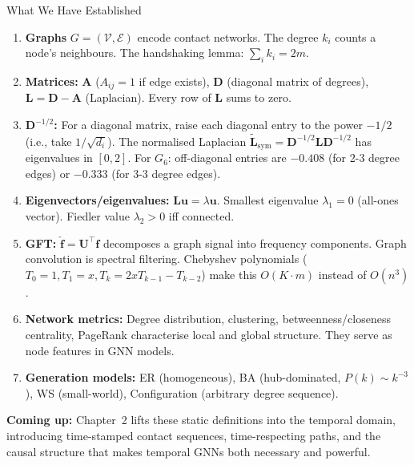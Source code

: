 \begin{conceptbox}{What We Have Established}
\begin{enumerate}[noitemsep]
    \item \textbf{Graphs} $G = (\mathcal{V}, \mathcal{E})$ encode contact networks. The degree $k_i$ counts a node's neighbours. The handshaking lemma: $\sum_i k_i = 2m$.
    \item \textbf{Matrices:} $\mathbf{A}$ ($A_{ij}=1$ if edge exists), $\mathbf{D}$ (diagonal matrix of degrees), $\mathbf{L} = \mathbf{D}-\mathbf{A}$ (Laplacian). Every row of $\mathbf{L}$ sums to zero.
    \item \textbf{$\mathbf{D}^{-1/2}$:} For a diagonal matrix, raise each diagonal entry to the power $-1/2$ (i.e., take $1/\sqrt{d_i}$). The normalised Laplacian $\tilde{\mathbf{L}}_{\mathrm{sym}} = \mathbf{D}^{-1/2}\mathbf{L}\mathbf{D}^{-1/2}$ has eigenvalues in $[0,2]$. For $G_6$: off-diagonal entries are $-0.408$ (for 2-3 degree edges) or $-0.333$ (for 3-3 degree edges).
    \item \textbf{Eigenvectors/eigenvalues:} $\mathbf{L}\mathbf{u} = \lambda\mathbf{u}$. Smallest eigenvalue $\lambda_1 = 0$ (all-ones vector). Fiedler value $\lambda_2 > 0$ iff connected.
    \item \textbf{GFT:} $\hat{\mathbf{f}} = \mathbf{U}^\top\mathbf{f}$ decomposes a graph signal into frequency components. Graph convolution is spectral filtering. Chebyshev polynomials ($T_0=1, T_1=x, T_k=2xT_{k-1}-T_{k-2}$) make this $O(K \cdot m)$ instead of $O(n^3)$.
    \item \textbf{Network metrics:} Degree distribution, clustering, betweenness/closeness centrality, PageRank characterise local and global structure. They serve as node features in GNN models.
    \item \textbf{Generation models:} ER (homogeneous), BA (hub-dominated, $P(k)\sim k^{-3}$), WS (small-world), Configuration (arbitrary degree sequence).
\end{enumerate}
\textbf{Coming up:} Chapter~2 lifts these static definitions into the temporal domain, introducing time-stamped contact sequences, time-respecting paths, and the causal structure that makes temporal GNNs both necessary and powerful.
\end{conceptbox}
